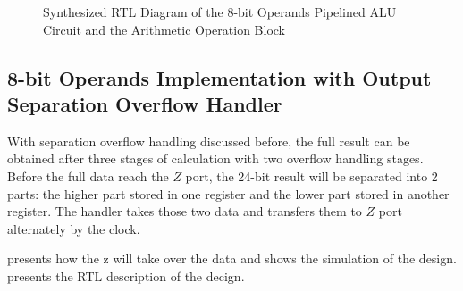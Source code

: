 \begin{figure}[!ht]
	\centering
	\caption{Synthesized RTL Diagram of the 8-bit Operands Pipelined ALU Circuit and the Arithmetic Operation Block}

	\hspace{0.5cm}
	\label{fig:p_8_rtl}
\end{figure}

\subsection{8-bit Operands Implementation with Output Separation Overflow Handler}

With separation overflow handling discussed before, the full result can be obtained after three stages of calculation with two overflow handling stages.
Before the full data reach the \(Z\) port, the 24-bit result will be separated into 2 parts: the higher part stored in one register and the lower part stored in another register.
The handler takes those two data and transfers them to \(Z\) port alternately by the clock.

 presents how the z will take over the data and  shows the simulation of the design.
 presents the RTL description of the decign.

\clearpage

